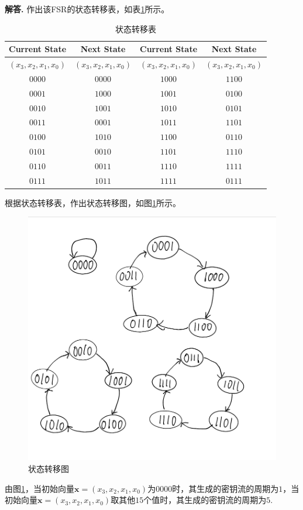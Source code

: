 \documentclass[12pt, a4paper, oneside]{ctexart}
\newenvironment{solution}{\par\noindent\textbf{解答. }}{\par}
\begin{document}
	\begin{solution}
		作出该\textrm{FSR}的状态转移表，如表\ref{tab:FSR}所示。
		\begin{table}[H]
			\caption{状态转移表}
			\label{tab:FSR} \centering
			\begin{tabular}{|c|c||c|c|}
				\hline
				Current State & Next State & Current State & Next State \\
				\hline
				$ \left ( x_3, x_2, x_1, x_0 \right ) $ & $ \left ( x_3, x_2, x_1, x_0 \right ) $ & $ \left ( x_3, x_2, x_1, x_0 \right ) $ & $ \left ( x_3, x_2, x_1, x_0 \right ) $ \\
				\hline
				$ 0000 $ & $ 0000 $ & $ 1000 $ & $ 1100 $ \\ \hline
				$ 0001 $ & $ 1000 $ & $ 1001 $ & $ 0100 $ \\ \hline
				$ 0010 $ & $ 1001 $ & $ 1010 $ & $ 0101 $ \\ \hline
				$ 0011 $ & $ 0001 $ & $ 1011 $ & $ 1101 $ \\ \hline
				$ 0100 $ & $ 1010 $ & $ 1100 $ & $ 0110 $ \\ \hline
				$ 0101 $ & $ 0010 $ & $ 1101 $ & $ 1110 $ \\ \hline
				$ 0110 $ & $ 0011 $ & $ 1110 $ & $ 1111 $ \\ \hline
				$ 0111 $ & $ 1011 $ & $ 1111 $ & $ 0111 $ \\ \hline
			\end{tabular}
		\end{table}
		
		根据状态转移表，作出状态转移图，如图\ref{fig:FSR}所示。
		
		\begin{figure}[H]
			\centering
			\includegraphics[width=0.7\linewidth]{fig/FSR}
			\caption{状态转移图}
			\label{fig:FSR}
		\end{figure}
		
		由图\ref{fig:FSR}，当初始向量$ \mathbf{x} =  \left ( x_3, x_2, x_1, x_0 \right ) $为$ 0000 $时，其生成的密钥流的周期为$ 1 $，当初始向量$ \mathbf{x} =  \left ( x_3, x_2, x_1, x_0 \right ) $取其他$ 15 $个值时，其生成的密钥流的周期为$ 5 $.
		
	\end{solution}
	
\end{document}
